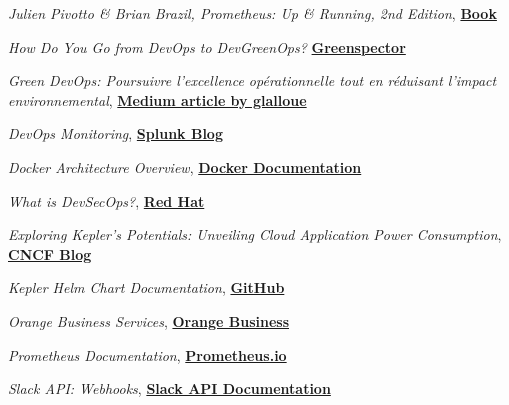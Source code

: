 \documentclass[12pt,a4paper,oneside]{book}
\begin{document}












\appendix


%



\begin{thebibliography}{99}
    
    \emph{Julien Pivotto \& Brian Brazil, Prometheus: Up \& Running, 2nd Edition},
    \href{https://www.oreilly.com/library/view/prometheus-up/9781098131135/}{\textbf{Book}}
    
    \emph{How Do You Go from DevOps to DevGreenOps?}
    \href{https://greenspector.com/en/how-do-you-go-from-devops-to-devgreenops/}{\textbf{Greenspector}}
    
    \emph{Green DevOps: Poursuivre l'excellence opérationnelle tout en réduisant l'impact environnemental},
    \href{https://glalloue.medium.com/green-devops-poursuivre-lexcellence-op%C3%A9rationnelle-tout-en-r%C3%A9duisant-l-impact-environnemental-de500cfcc9eb}{\textbf{Medium article by glalloue}}
    
    \emph{DevOps Monitoring},
    \href{https://www.splunk.com/en_us/blog/learn/devops-monitoring.html}{\textbf{Splunk Blog}}
    
    \emph{Docker Architecture Overview},
    \href{https://docs.docker.com/get-started/overview/#:~:text=with%20fewer%20resources.-,Docker%20architecture,to%20a%20remote%20Docker%20daemon.}{\textbf{Docker Documentation}}
    
    \emph{What is DevSecOps?},
    \href{https://www.redhat.com/en/topics/devops/what-is-devsecops}{\textbf{Red Hat}}
    
    \emph{Exploring Kepler's Potentials: Unveiling Cloud Application Power Consumption},
    \href{https://www.cncf.io/blog/2023/10/11/exploring-keplers-potentials-unveiling-cloud-application-power-consumption/}{\textbf{CNCF Blog}}
    
    \emph{Kepler Helm Chart Documentation},
    \href{https://github.com/sustainable-computing-io/kepler-helm-chart/blob/main/README.md}{\textbf{GitHub}}
    
    \emph{Orange Business Services},
    \href{https://www.orange-business.com/fr}{\textbf{Orange Business}}
    
    \emph{Prometheus Documentation},
    \href{https://prometheus.io/docs}{\textbf{Prometheus.io}}
    
    \emph{Slack API: Webhooks},
    \href{https://api.slack.com/messaging/webhooks}{\textbf{Slack API Documentation}}
    
    \end{thebibliography}
    
\end{document}
